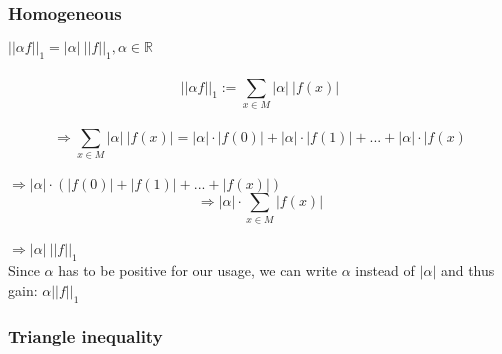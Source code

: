 \documentclass{article}
\begin{document}
\subsubsection{Homogeneous}
$||\alpha f||_1 = |\alpha|~||f||_1, \alpha \in \mathbb{R}$\\
\\
\[||\alpha f||_1 := \sum_{x \in M}{|\alpha|~|f(x)|}\]\\
\[\Rightarrow \sum_{x \in M}{|\alpha|~|f(x)|} = |\alpha| \cdot |f(0)| + |\alpha| \cdot |f(1)| + ... + |\alpha| \cdot |f(x)\] \\
$\Rightarrow |\alpha| \cdot ( |f(0)| + |f(1)| + ... + |f(x)|)$ \\
\[\Rightarrow |\alpha| \cdot \sum_{x \in M}{ |f(x)|}\] \\
$\Rightarrow |\alpha|~||f||_1$\\
Since $\alpha$ has to be positive for our usage, we can write $\alpha$ instead of $|\alpha|$ and thus gain: $\alpha ||f||_1$
\newpage
\subsubsection{Triangle inequality}
\end{document}
